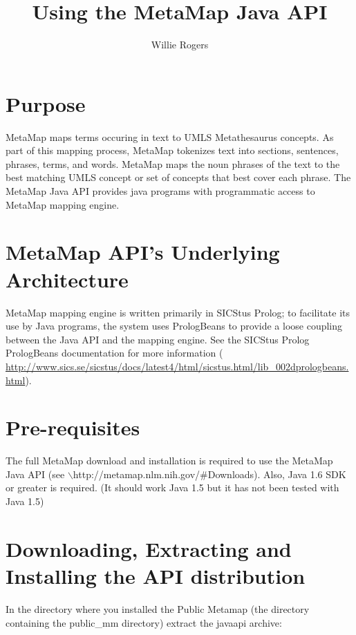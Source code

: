 \documentclass[11pt]{article}
\begin{document}
\title{Using the MetaMap Java API}
\author{Willie Rogers}
\maketitle
\tableofcontents

\section{Purpose}
\label{Purpose}

MetaMap maps terms occuring in text to UMLS Metathesaurus concepts. As
part of this mapping process, MetaMap tokenizes text into sections,
sentences, phrases, terms, and words. MetaMap maps the noun phrases of
the text to the best matching UMLS concept or set of concepts that
best cover each phrase.  The MetaMap Java API provides java programs
with programmatic access to MetaMap mapping engine.


\section{MetaMap API's Underlying Architecture}
\label{MetaMap API's Underlying Architecture}

MetaMap mapping engine is written primarily in SICStus Prolog; to
facilitate its use by Java programs, the system uses PrologBeans to
provide a loose coupling between the Java API and the mapping engine.
See the SICStus Prolog PrologBeans documentation for more information
( \url{http://www.sics.se/sicstus/docs/latest4/html/sicstus.html/lib\_002dprologbeans.html}).


\section{Pre-requisites}
\label{Pre-requisites}

The full MetaMap download and installation is required to use the
MetaMap Java API (see \(\backslash\)http://metamap.nlm.nih.gov/\#Downloads).  Also,
Java 1.6 SDK or greater is required.  (It should work Java 1.5 but it
has not been tested with Java 1.5)


\section{Downloading, Extracting and Installing the API distribution}
\label{Downloading, Extracting and Installing the API distribution}

In the directory where you installed the Public Metamap (the directory
containing the public\_mm directory) extract the javaapi archive:
\end{document}
